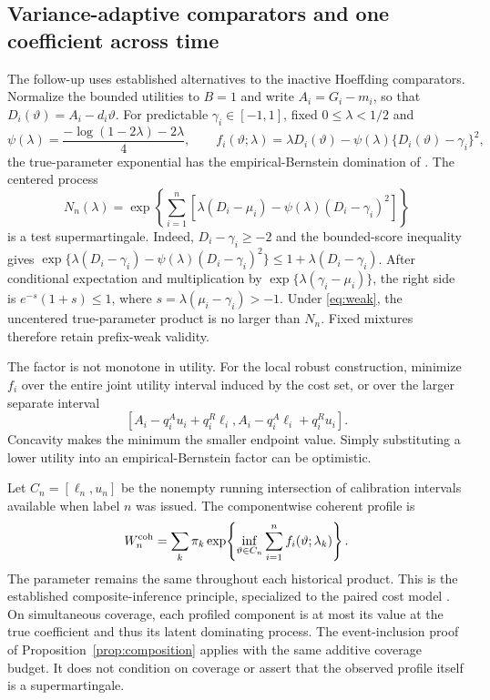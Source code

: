 \subsection{Variance-adaptive comparators and one coefficient across time}
\label{sec:followup-methods}

The follow-up uses established alternatives to the inactive Hoeffding
comparators. Normalize the bounded utilities to $B=1$ and write
$A_i=G_i-m_i$, so that $D_i(\vartheta)=A_i-d_i\vartheta$.
For predictable $\gamma_i\in[-1,1]$, fixed $0\leq\lambda<1/2$ and
\[
 \psi(\lambda)=\frac{-\log(1-2\lambda)-2\lambda}{4},
 \qquad
 f_i(\vartheta;\lambda)=\lambda D_i(\vartheta)
             -\psi(\lambda)\{D_i(\vartheta)-\gamma_i\}^2,
\]
the true-parameter exponential has the empirical-Bernstein domination of
\citet{choe2024}. The centered process
\[
 N_n(\lambda)=\exp\!\left\{\sum_{i=1}^n
 [\lambda(D_i-\mu_i)-\psi(\lambda)(D_i-\gamma_i)^2]\right\}
\]
is a test supermartingale. Indeed, $D_i-\gamma_i\geq-2$ and the bounded-score
inequality gives
$\exp\{\lambda(D_i-\gamma_i)-\psi(\lambda)(D_i-\gamma_i)^2\}
\leq1+\lambda(D_i-\gamma_i)$.
After conditional expectation and multiplication by
$\exp\{\lambda(\gamma_i-\mu_i)\}$, the right side is
$e^{-s}(1+s)\leq1$, where $s=\lambda(\mu_i-\gamma_i)>-1$.
Under \eqref{eq:weak}, the uncentered true-parameter product is no larger
than $N_n$. Fixed mixtures therefore retain prefix-weak validity.

The factor is not monotone in utility. For the local robust construction,
minimize $f_i$ over the entire joint utility interval induced by the cost set,
or over the larger separate interval
\[
 [A_i-q^A_i u_i+q^R_i\ell_i,
   A_i-q^A_i\ell_i+q^R_i u_i].
\]
Concavity makes the minimum the smaller endpoint value. Simply substituting a
lower utility into an empirical-Bernstein factor can be optimistic.

Let $C_n=[\ell_n,u_n]$ be the nonempty running intersection of calibration
intervals available when label $n$ was issued. The componentwise coherent
profile is
\begin{equation}
 W_n^{\rm coh}=\sum_k\pi_k
 \exp\!\left\{\inf_{\vartheta\in C_n}
                  \sum_{i=1}^n f_i(\vartheta;\lambda_k)\right\}.
 \label{eq:coherent}
\end{equation}
The parameter remains the same throughout each historical product. This is
the established composite-inference principle, specialized to the paired
cost model \citep{wasserman2020,ramdas2022}. On simultaneous coverage,
each profiled component is at most its value at the true coefficient and
thus its latent dominating process. The event-inclusion proof of
Proposition~\ref{prop:composition} applies with the same additive coverage
budget. It does not condition on coverage or assert that the observed profile
itself is a supermartingale.

